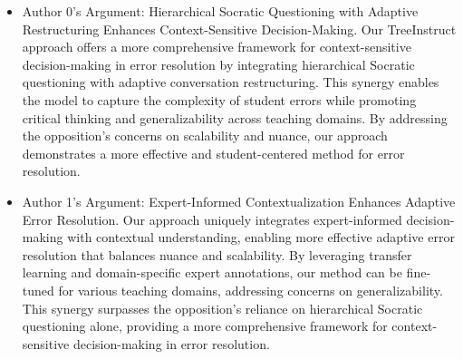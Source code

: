 \begin{enumerate}
\begin{enumerate}
        \begin{itemize}
            \item Author 0's Argument: Hierarchical Socratic Questioning with Adaptive Restructuring Enhances Context-Sensitive Decision-Making. Our TreeInstruct approach offers a more comprehensive framework for context-sensitive decision-making in error resolution by integrating hierarchical Socratic questioning with adaptive conversation restructuring. This synergy enables the model to capture the complexity of student errors while promoting critical thinking and generalizability across teaching domains. By addressing the opposition's concerns on scalability and nuance, our approach demonstrates a more effective and student-centered method for error resolution.
		\item Author 1's Argument: Expert-Informed Contextualization Enhances Adaptive Error Resolution. Our approach uniquely integrates expert-informed decision-making with contextual understanding, enabling more effective adaptive error resolution that balances nuance and scalability. By leveraging transfer learning and domain-specific expert annotations, our method can be fine-tuned for various teaching domains, addressing concerns on generalizability. This synergy surpasses the opposition's reliance on hierarchical Socratic questioning alone, providing a more comprehensive framework for context-sensitive decision-making in error resolution.
        \end{itemize}
    \end{enumerate}




\end{enumerate}
